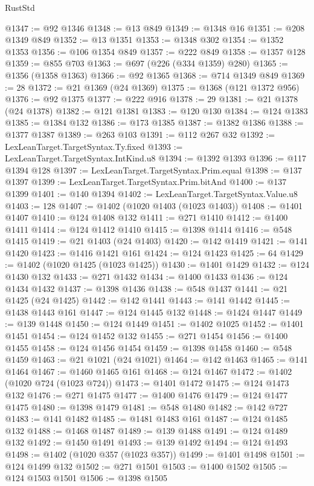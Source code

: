 \begin{lexlean}{RustStd}
\begin{coremodule}
@1347 := @92 @1346
@1348 := @13 @849
@1349 := @1348 @16
@1351 := @208 @1349 @849
@1352 := @13 @1351
@1353 := @1348 @302
@1354 := @1352 @1353
@1356 := @106 @1354 @849
@1357 := @222 @849
@1358 := @1357 @128
@1359 := @855 @703
@1363 := @697 (@226 (@334 @1359) @280)
@1365 := @1356 (@1358 @1363)
@1366 := @92 @1365
@1368 := @714 @1349 @849
@1369 := 28
@1372 := @21 @1369 (@24 @1369)
@1375 := @1368 (@121 @1372 @956)
@1376 := @92 @1375
@1377 := @222 @916
@1378 := 29
@1381 := @21 @1378 (@24 @1378)
@1382 := @121 @1381
@1383 := @120 @130
@1384 := @124 @1383
@1385 := @1384 @132
@1386 := @173 @1385
@1387 := @1382 @1386
@1388 := @1377 @1387
@1389 := @263 @103
@1391 := @112 @267 @32
@1392 := LexLeanTarget.TargetSyntax.Ty.fixed
@1393 := LexLeanTarget.TargetSyntax.IntKind.u8
@1394 := @1392 @1393
@1396 := @117 @1394 @128
@1397 := LexLeanTarget.TargetSyntax.Prim.equal
@1398 := @137 @1397
@1399 := LexLeanTarget.TargetSyntax.Prim.bitAnd
@1400 := @137 @1399
@1401 := @140 @1394
@1402 := LexLeanTarget.TargetSyntax.Value.u8
@1403 := 128
@1407 := @1402 (@1020 @1403 (@1023 @1403))
@1408 := @1401 @1407
@1410 := @124 @1408 @132
@1411 := @271 @1410
@1412 := @1400 @1411
@1414 := @124 @1412 @1410
@1415 := @1398 @1414
@1416 := @548 @1415
@1419 := @21 @1403 (@24 @1403)
@1420 := @142 @1419
@1421 := @141 @1420
@1423 := @1416 @1421 @161
@1424 := @124 @1423
@1425 := 64
@1429 := @1402 (@1020 @1425 (@1023 @1425))
@1430 := @1401 @1429
@1432 := @124 @1430 @132
@1433 := @271 @1432
@1434 := @1400 @1433
@1436 := @124 @1434 @1432
@1437 := @1398 @1436
@1438 := @548 @1437
@1441 := @21 @1425 (@24 @1425)
@1442 := @142 @1441
@1443 := @141 @1442
@1445 := @1438 @1443 @161
@1447 := @124 @1445 @132
@1448 := @1424 @1447
@1449 := @139 @1448
@1450 := @124 @1449
@1451 := @1402 @1025
@1452 := @1401 @1451
@1454 := @124 @1452 @132
@1455 := @271 @1454
@1456 := @1400 @1455
@1458 := @124 @1456 @1454
@1459 := @1398 @1458
@1460 := @548 @1459
@1463 := @21 @1021 (@24 @1021)
@1464 := @142 @1463
@1465 := @141 @1464
@1467 := @1460 @1465 @161
@1468 := @124 @1467
@1472 := @1402 (@1020 @724 (@1023 @724))
@1473 := @1401 @1472
@1475 := @124 @1473 @132
@1476 := @271 @1475
@1477 := @1400 @1476
@1479 := @124 @1477 @1475
@1480 := @1398 @1479
@1481 := @548 @1480
@1482 := @142 @727
@1483 := @141 @1482
@1485 := @1481 @1483 @161
@1487 := @124 @1485 @132
@1488 := @1468 @1487
@1489 := @139 @1488
@1491 := @124 @1489 @132
@1492 := @1450 @1491
@1493 := @139 @1492
@1494 := @124 @1493
@1498 := @1402 (@1020 @357 (@1023 @357))
@1499 := @1401 @1498
@1501 := @124 @1499 @132
@1502 := @271 @1501
@1503 := @1400 @1502
@1505 := @124 @1503 @1501
@1506 := @1398 @1505

\end{coremodule}
\end{lexlean}
